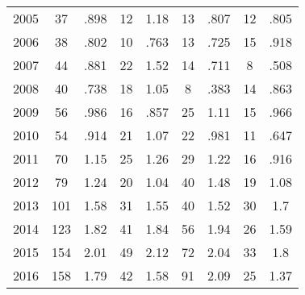 \begin{table}[htbp]
\begin{tabular}{l*{8}{c}}
2005      &       37&     .898&       12&     1.18&       13&     .807&       12&     .805\\
2006      &       38&     .802&       10&     .763&       13&     .725&       15&     .918\\
2007      &       44&     .881&       22&     1.52&       14&     .711&        8&     .508\\
2008      &       40&     .738&       18&     1.05&        8&     .383&       14&     .863\\
2009      &       56&     .986&       16&     .857&       25&     1.11&       15&     .966\\
2010      &       54&     .914&       21&     1.07&       22&     .981&       11&     .647\\
2011      &       70&     1.15&       25&     1.26&       29&     1.22&       16&     .916\\
2012      &       79&     1.24&       20&     1.04&       40&     1.48&       19&     1.08\\
2013      &      101&     1.58&       31&     1.55&       40&     1.52&       30&      1.7\\
2014      &      123&     1.82&       41&     1.84&       56&     1.94&       26&     1.59\\
2015      &      154&     2.01&       49&     2.12&       72&     2.04&       33&      1.8\\
2016      &      158&     1.79&       42&     1.58&       91&     2.09&       25&     1.37\\
\hline\hline
\end{tabular}
\end{table}
